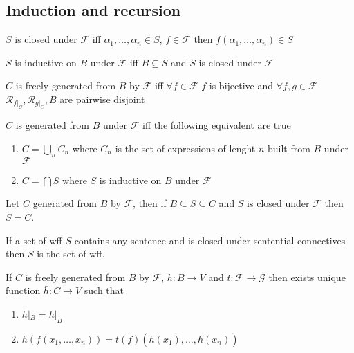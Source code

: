 \documentclass[../main.tex]{subfiles}
\begin{document}
\subsection{Induction and recursion}


\begin{definition}
    $S$ is closed under $\mathcal{F}$ iff $\alpha_1,\dots,\alpha_n\in S$, $f\in\mathcal{F}$ then $f(\alpha_1,\dots,\alpha_n)\in S$
\end{definition}
\begin{definition}
    $S$ is inductive on $B$ under $\mathcal{F}$ iff  $B\subseteq S$ and $S$ is closed under $\mathcal{F}$
\end{definition}
\begin{definition}
    $C$ is freely generated from $B$ by $\mathcal{F}$ iff $\forall f\in\mathcal{F}$ $f$ is bijective and $\forall f,g\in \mathcal{F}$ $\mathcal{R}_{f|_C}, \mathcal{R}_{g|_C}, B$ are pairwise disjoint
\end{definition}
\begin{definition}
    $C$ is generated from $B$ under $\mathcal{F}$ iff the following equivalent are true
    \begin{enumerate}
        \item $C=\bigcup_n C_n$ where $C_n$ is the set of expressions of lenght $n$ built from $B$ under $\mathcal{F}$
        \item $C=\bigcap S$ where $S$ is inductive on $B$ under $\mathcal{F}$
    \end{enumerate}
\end{definition}
\begin{theorem}
    Let $C$ generated from $B$ by $\mathcal{F}$, then if $B\subseteq S \subseteq C$ and $S$ is closed under $\mathcal{F}$ then $S=C$.
\end{theorem}
\begin{corollary}
    If a set of wff $S$ contains any sentence and is closed under sentential connectives then $S$ is the set of wff.
\end{corollary}
\begin{theorem}
    If $C$ is freely generated from $B$ by $\mathcal{F}$, $h:B\rightarrow V$ and $t:\mathcal{F}\rightarrow\mathcal{G}$ then exists unique function $\bar{h}: C\rightarrow V$ such that
    \begin{enumerate}
        \item $\bar{h}|_B = h|_B$
        \item $\bar{h}(f(x_1,\dots,x_n)) = t(f)(\bar{h}(x_1),\dots,\bar{h}(x_n))$
    \end{enumerate}
\end{theorem}
\end{document}
